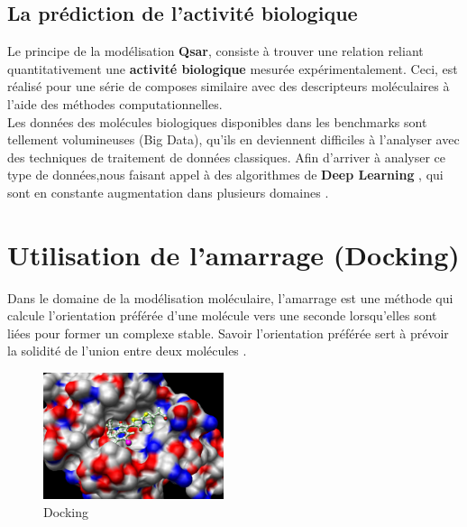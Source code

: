 \documentclass[12pt]{report}
\begin{document}
\newpage
\subsection{La prédiction de l'activité biologique}
Le principe de la modélisation \textbf{Qsar}, consiste à trouver une relation reliant quantitativement une \textbf{activité biologique} mesurée expérimentalement. Ceci, est réalisé pour une série de composes similaire avec des descripteurs moléculaires à l'aide des méthodes computationnelles.\\
Les données des molécules biologiques disponibles dans les benchmarks sont tellement volumineuses (Big Data), qu'ils en deviennent difficiles à l'analyser avec des techniques de traitement de données classiques. Afin d'arriver à analyser ce type de données,nous faisant appel à des algorithmes de \textbf{Deep Learning }, qui sont en constante augmentation dans plusieurs domaines \cite{ref22}.

\section{Utilisation de l'amarrage (Docking)}
Dans le domaine de la modélisation moléculaire, l'amarrage est une méthode qui calcule l'orientation préférée d'une molécule vers une seconde lorsqu'elles sont liées pour former un complexe stable. Savoir l'orientation préférée sert à prévoir la solidité de l'union entre deux molécules \cite{ref23} .
\begin{figure}[h]
\begin{center}
\includegraphics[width=200]{Docking.jpg}
\end{center}
\caption{Docking}
\end{figure}
\end{document}
